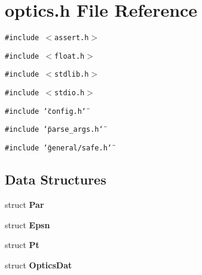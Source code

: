\section{optics.h File Reference}
\label{optics_8h}
{\tt \#include $<$assert.h$>$}\par
{\tt \#include $<$float.h$>$}\par
{\tt \#include $<$stdlib.h$>$}\par
{\tt \#include $<$stdio.h$>$}\par
{\tt \#include \char`\"{}config.h\char`\"{}}\par
{\tt \#include \char`\"{}parse\_\-args.h\char`\"{}}\par
{\tt \#include \char`\"{}general/safe.h\char`\"{}}\par
\subsection*{Data Structures}
\begin{CompactItemize}
\item 
struct {\bf Par}
\item 
struct {\bf Epsn}
\item 
struct {\bf Pt}
\item 
struct {\bf OpticsDat}
\end{CompactItemize}
